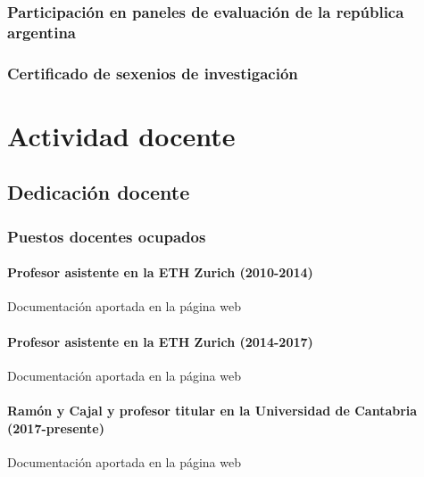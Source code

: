 \documentclass[a4paper, 11pt, twoside, openright]{report}
\begin{document}
\subsection{Participación en paneles de evaluación de la república argentina}


\subsection{Certificado de sexenios de investigación}



\chapter{Actividad docente}

\section{Dedicación docente}

\subsection{Puestos docentes ocupados}

\subsubsection{Profesor asistente en la ETH Zurich (2010-2014)}
%
Documentación aportada en la página web

\subsubsection{Profesor asistente en la ETH Zurich (2014-2017)}
%
Documentación aportada en la página web

\subsubsection{Ramón y Cajal y profesor titular en la Universidad de Cantabria (2017-presente)}
%
Documentación aportada en la página web
\end{document}
